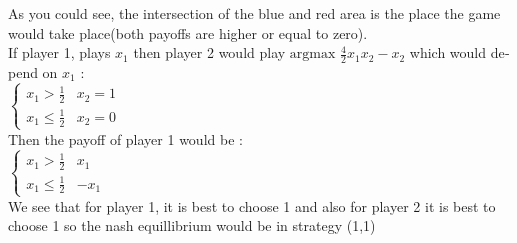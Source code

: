 \begin{latin}
\begin{enumerate}
\begin{center}
    \end{center}
    As you could see, the intersection of the blue and red area is the place the game would take place(both payoffs are higher or equal to zero).\\
    If player 1, plays $x_1$ then player 2 would play $\text{argmax } \frac{4}{2}x_1x_2 - x_2$ which would depend on $x_1$ : \\
    $ \begin{cases}
        x_1 > \frac{1}{2} & x_2 = 1 \\
        x_1 \leq \frac{1}{2} & x_2 = 0
    \end{cases} $
     \\
     Then the payoff of player 1 would be : \\
     $ \begin{cases}
        x_1 > \frac{1}{2} & x_1 \\
        x_1 \leq \frac{1}{2} & -x_1
    \end{cases} $ \\
    We see that for player 1, it is best to choose 1 and also for player 2 it is best to choose 1 so the nash equillibrium would be in strategy (1,1)
\end{enumerate}
\end{latin}